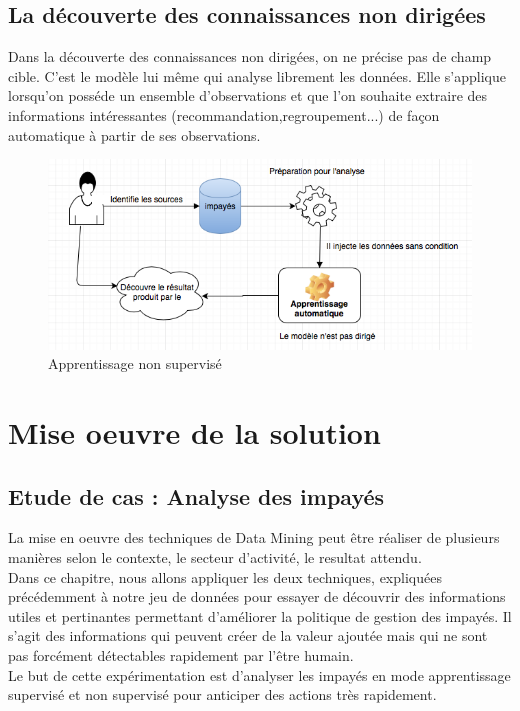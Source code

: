 \documentclass[11pt,a4paper]{report}
\begin{document}
\subsection{La découverte des connaissances non dirigées}
Dans la découverte des connaissances non dirigées, on ne précise pas de champ cible. C'est le modèle lui même qui analyse librement les données. Elle s'applique lorsqu'on posséde un ensemble d'observations et que l'on souhaite extraire des informations intéressantes (recommandation,regroupement...) de façon automatique à partir de ses observations. 
\begin{figure}[h]
\centering
\includegraphics[scale=0.70]{nondirigees.png}
\caption{Apprentissage non supervisé}
\label{nondirigee}
\end{figure}


\newpage 

\section{Mise oeuvre de la solution}
  \subsection{Etude de cas : Analyse des impayés}
  
La mise en oeuvre des techniques de Data Mining peut être réaliser de plusieurs manières selon le contexte, le secteur d'activité, le resultat attendu. \\

Dans ce chapitre, nous allons appliquer les deux techniques, expliquées précédemment à notre  jeu de données pour essayer de découvrir des informations utiles et pertinantes permettant d'améliorer la politique de gestion des impayés. Il s'agit des informations qui peuvent créer de la valeur ajoutée mais qui ne sont pas forcément détectables rapidement par l'être humain.
\\
Le but de cette expérimentation est d'analyser les impayés en mode apprentissage supervisé et non supervisé pour anticiper des actions très rapidement.  
 \\
\end{document}
